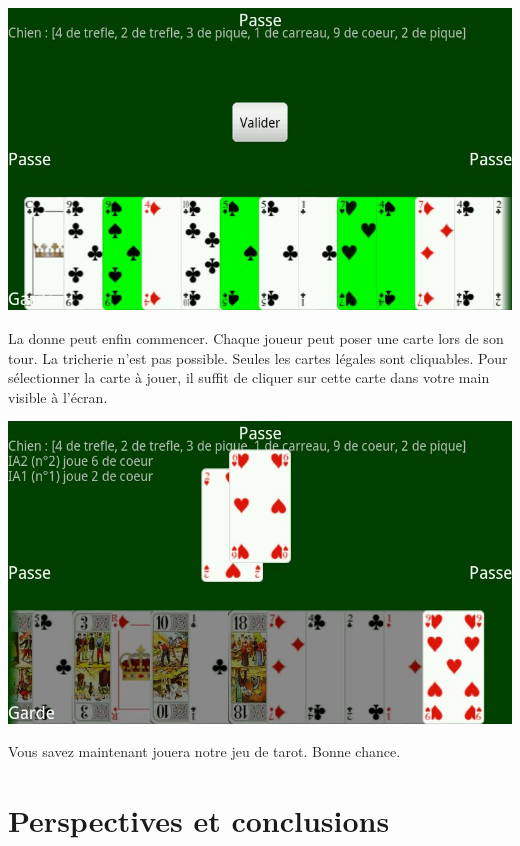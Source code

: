 \documentclass[a4paper]{report}
\begin{document}
		\begin{center}
			\includegraphics[scale=0.4]{Images/jeu.jpg}\\
		\end{center}
La donne peut enfin commencer. Chaque joueur peut poser une carte lors de son tour. La tricherie n’est pas possible. Seules les cartes légales sont cliquables. Pour sélectionner la carte à jouer, il suffit de cliquer sur cette carte dans votre main visible à l’écran.\\

		\begin{center}
			\includegraphics[scale=0.4]{Images/jeu2.jpg}\\
		\end{center}
Vous savez maintenant jouera notre jeu de tarot. Bonne chance.





\chapter{Perspectives et conclusions}
\end{document}

